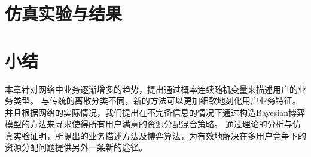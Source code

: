 \section{仿真实验与结果}

\section{小结}
本章针对网络中业务逐渐增多的趋势，提出通过概率连续随机变量来描述用户的业务类型。
与传统的离散分类不同，新的方法可以更加细致地刻化用户业务特征。
并且根据网络的实际情况，我们提出在不完备信息的情况下通过构造Bayesian博弈模型的方法来寻求使得所有用户满意的资源分配混合策略。
通过理论的分析与仿真实验证明，所提出的业务描述方法及博弈算法，为有效地解决在多用户竞争下的资源分配问题提供另外一条新的途径。


